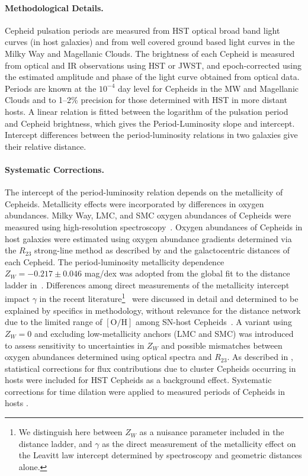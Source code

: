 \paragraph{Methodological Details.}
Cepheid pulsation periods are measured from HST optical broad band light curves (in host galaxies) and from well covered ground based light curves in the Milky Way and Magellanic Clouds.  The brightness of each Cepheid is measured from optical and IR observations using HST or JWST, and epoch-corrected using the estimated amplitude and phase of the light curve obtained from optical data.  Periods are known at the $10^{-4}$ day level for Cepheids in the MW and Magellanic Clouds and to 1--2\% precision for those determined with HST in more distant hosts. A linear relation is fitted between the logarithm of the pulsation period and Cepheid brightness, which gives the Period-Luminosity slope and intercept. Intercept differences between the period-luminosity relations in two galaxies give their relative distance.

\paragraph{Systematic Corrections.}
The intercept of the period-luminosity relation depends on the metallicity of Cepheids. Metallicity effects were incorporated by differences in oxygen abundances. Milky Way, LMC, and SMC oxygen abundances of Cepheids were measured using high-resolution spectroscopy~\citep{2022A&A...658A..29R, 2023ApJ...955L..13B, 2024ApJ...973...30B}. Oxygen abundances of Cepheids in host galaxies were estimated using oxygen abundance gradients determined via the $R_{23}$ strong-line method as described by \citet[][Sect.\,3.5]{2022ApJ...934L...7R} and the galactocentric distances of each Cepheid. The period-luminosity metallicity dependence $Z_W=-0.217\pm0.046$ mag/dex was adopted from the global fit to the distance ladder in~\citet{2022ApJ...934L...7R}. Differences among direct measurements of the metallicity intercept impact $\gamma$ in the recent literature\footnote{We distinguish here between $Z_W$ as a nuisance parameter included in the distance ladder, and $\gamma$ as the direct measurement of the metallicity effect on the Leavitt law intercept determined by spectroscopy and geometric distances alone.}~\citep[e.g.,][]{2022ApJ...939...89B, 2023ApJ...955L..13B, 2024A&A...690A.246T, 2024A&A...683A.234B, 2025arXiv250522512K, 2025arXiv250715936B} were discussed in detail and determined to be explained by specifics in methodology, without relevance for the distance network due to the limited range of $\mathrm{[O/H]}$ among SN-host Cepheids~\citep[see Fig.\,21 from][]{2022ApJ...934L...7R}. A variant using $Z_W=0$ and excluding low-metallicity anchors (LMC and SMC) was introduced to assess sensitivity to uncertainties in $Z_W$ and possible mismatches between oxygen abundances determined using optical spectra and $R_{23}$.
As described in \citet{2022ApJ...934L...7R}, statistical corrections for flux contributions due to cluster Cepheids occurring in hosts \citep{2018ApJ...861...36A} were included for HST Cepheids as a background effect. Systematic corrections for time dilation were applied to measured periods of Cepheids in hosts \citep{2019A&A...631A.165A,2022A&A...658A.148A}.

